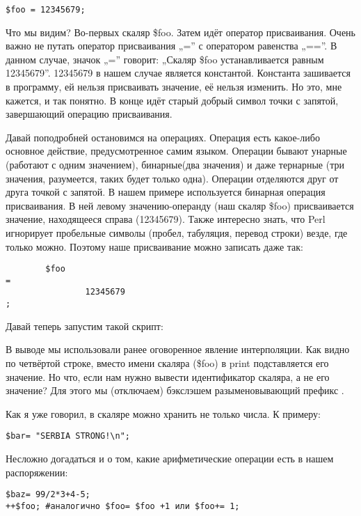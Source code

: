 \begin{verbatim}
$foo = 12345679;
\end{verbatim}

Что мы видим? Во-первых скаляр \$foo. Затем идёт оператор присваивания. Очень 
важно не путать оператор присваивания „=” с оператором равенства „==”. В 
данном случае, значок „=” говорит: „Скаляр \$foo устанавливается равным 
12345679”. 12345679 в нашем случае является константой. Константа зашивается в 
программу, ей нельзя присваивать значение, её нельзя изменить. Но это, мне 
кажется, и так понятно. В конце идёт старый добрый символ точки с запятой, 
завершающий операцию присваивания.

Давай поподробней остановимся на операциях. Операция есть какое-либо 
основное действие, предусмотренное самим языком. Операции бывают унарные 
(работают с одним значением), бинарные(два значения) и даже тернарные (три 
значения, разумеется, таких будет только одна). Операции отделяются друг 
от друга точкой с запятой. В нашем примере используется бинарная операция 
присваивания. В ней левому значению-операнду (наш скаляр \$foo) 
присваивается значение, находящееся справа (12345679). Также интересно знать, 
что Perl игнорирует пробельные символы (пробел, табуляция, перевод строки) 
везде, где только можно. Поэтому наше присваивание можно записать даже 
так:

\begin{verbatim}
        $foo
=
                12345679
;
\end{verbatim}

Давай теперь запустим такой скрипт:


В выводе мы использовали ранее оговоренное явление интерполяции. Как 
видно по четвёртой строке, вместо имени скаляра (\$foo) в print подставляется 
его значение. Но что, если нам нужно вывести идентификатор скаляра, а не 
его значение? Для этого мы  (отключаем) бэкслэшем 
разыменовывающий префикс \remph{\$} .

Как я уже говорил, в скаляре можно хранить не только числа. К примеру:

\begin{verbatim}
$bar= "SERBIA STRONG!\n";
\end{verbatim}

Несложно догадаться и о том, какие арифметические операции есть в нашем 
распоряжении:

\begin{verbatim}
$baz= 99/2*3+4-5;
++$foo; #аналогично $foo= $foo +1 или $foo+= 1;
\end{verbatim}

